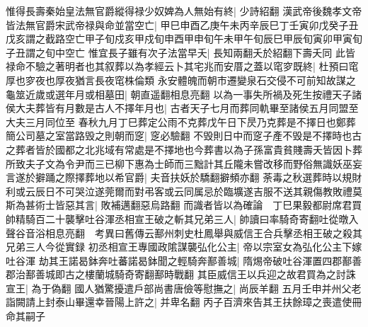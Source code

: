 惟得長壽秦始皇法無官爵縱得禄少奴婢為人無始有終|{
	少詩紹翻}
漢武帝後魏孝文帝皆法無官爵宋武帝禄與命並當空亡|{
	甲巳申酉乙庚午未丙辛辰巳丁壬寅卯戊癸子丑戊亥謂之截路空亡甲子旬戍亥甲戍旬申酉甲申旬午未甲午旬辰巳甲辰旬寅卯甲寅旬子丑謂之旬中空亡}
惟宜長子雖有次子法當早夭|{
	長知兩翻夭於紹翻下壽夭同}
此皆禄命不驗之著明者也其叙葬以為孝經云卜其宅兆而安厝之蓋以窀穸既終|{
	杜預曰窀厚也穸夜也厚夜猶言長夜窀株倫類}
永安體魄而朝市遷變泉石交侵不可前知故謀之龜筮近歲或選年月或相墓田|{
	朝直遥翻相息亮翻}
以為一事失所禍及死生按禮天子諸侯大夫葬皆有月數是古人不擇年月也|{
	古者天子七月而葬同軌畢至諸侯五月同盟至大夫三月同位至}
春秋九月丁巳葬定公雨不克葬戊午日下昃乃克葬是不擇日也鄭葬簡公司墓之室當路毁之則朝而窆|{
	窆必驗翻}
不毁則日中而窆子產不毁是不擇時也古之葬者皆於國都之北兆域有常處是不擇地也今葬書以為子孫富貴貧賤壽夭皆因卜葬所致夫子文為令尹而三已柳下惠為士師而三黜計其丘隴未嘗改移而野俗無識妖巫妄言遂於擗踊之際擇葬地以希官爵|{
	夫音扶妖於驕翻擗頻亦翻}
荼毒之秋選葬時以規財利或云辰日不可哭泣遂莞爾而對弔客或云同属忌於臨壙遂吉服不送其親傷教敗禮莫斯為甚術士皆惡其言|{
	敗補邁翻惡烏路翻}
而識者皆以為確論　丁巳果毅都尉席君買帥精騎百二十襲擊吐谷渾丞相宣王破之斬其兄弟三人|{
	帥讀曰率騎奇寄翻吐從暾入聲谷音浴相息亮翻　考異曰舊傳云鄯州刺史杜鳳舉與威信王合兵擊丞相王破之殺其兄弟三人今從實録}
初丞相宣王專國政隂謀襲弘化公主|{
	帝以宗室女為弘化公主下嫁吐谷渾}
劫其王諾曷鉢奔吐蕃諾曷鉢聞之輕騎奔鄯善城|{
	隋焬帝破吐谷渾置四郡鄯善郡治鄯善城即古之樓蘭城騎奇寄翻鄯時戰翻}
其臣威信王以兵迎之故君買為之討誅宣王|{
	為于偽翻}
國人猶驚擾遣戶部尚書唐儉等慰撫之|{
	尚辰羊翻}
五月壬申并州父老詣闕請上封泰山畢還幸晉陽上許之|{
	并卑名翻}
丙子百濟來告其王扶餘璋之喪遣使冊命其嗣子

